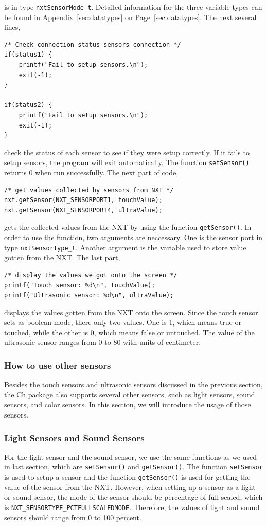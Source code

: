 \documentclass[11pt]{article}
\begin{document}
is in type {\tt nxtSensorMode\_t}. Detailed information for the three variable 
types can be found in Appendix~\ref{sec:datatypes} on Page~\ref{sec:datatypes}. 
The next several lines,
\begin{lstlisting}
/* Check connection status sensors connection */
if(status1) {
    printf("Fail to setup sensors.\n");
    exit(-1);
}

if(status2) {
    printf("Fail to setup sensors.\n");
    exit(-1);
}
\end{lstlisting}
check the status of each sensor to see if they were setup correctly. If it fails 
to setup sensors, the program will exit automatically. The function {\tt setSensor()} 
returns 0 when run successfully. The next part of code,
\begin{lstlisting}
/* get values collected by sensors from NXT */
nxt.getSensor(NXT_SENSORPORT1, touchValue);
nxt.getSensor(NXT_SENSORPORT4, ultraValue);
\end{lstlisting}
gets the collected values from the NXT by using the function {\tt getSensor()}. 
In order to use the function, two arguments are neccessary. One is the sensor port 
in type {\tt nxtSensorType\_t}. Another argument is the variable used to store 
value gotten from the NXT. The last part,
\begin{lstlisting}
/* display the values we got onto the screen */
printf("Touch sensor: %d\n", touchValue);
printf("Ultrasonic sensor: %d\n", ultraValue);
\end{lstlisting}
displays the values gotten from the NXT onto the screen. Since the touch sensor
sets as boolean mode, there only two values. One is 1, which means true or touched,
while the other is 0, which means false or untouched. The value of the ultrasonic
sensor ranges from 0 to 80 with units of centimeter.

\subsubsection{How to use other sensors\label{sec:sensor_other}}
Besides the touch sensors and ultrasonic sensors discussed in the previous section,
the Ch package also supports several other sensors, such as light sensors, sound 
sensors, and color sensors. In this section, we will introduce the usage of those 
sensors.

\subsubsection*{Light Sensors and Sound Sensors}
For the light sensor and the sound sensor, we use the same functions as we used
in last section, which are {\tt setSensor()} and {\tt getSensor()}. The function
{\tt setSensor} is used to setup a sensor and the function {\tt getSensor()} is
used for getting the value of the sensor from the NXT. However, when setting up 
a sensor as a light or sound sensor, the mode of the sensor should be percentage 
of full scaled, which is {\tt NXT\_SENSORTYPE\_PCTFULLSCALEDMODE}. Therefore, 
the values of light and sound sensors should range from 0 to 100 percent. \\
\end{document}
